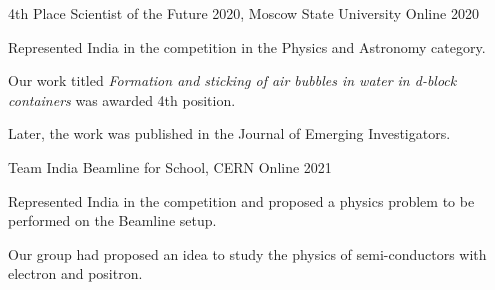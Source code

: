 



\begin{cventries}
  \cventry
  {4th Place} %
  {Scientist of the Future 2020, Moscow State University} %
  {Online} %
  {2020} %
  {
    \begin{cvitems}
      \item Represented India in the competition in the Physics and Astronomy category.
      \item Our work titled \emph{Formation and sticking of air bubbles in water in d-block containers} was awarded 4th position. 
      \item Later, the work was published in the Journal of Emerging Investigators.  
    \end{cvitems}
  }

  \cventry
  {Team India} %
  {Beamline for School, CERN} %
  {Online} %
  {2021} %
  {
    \begin{cvitems}
      \item Represented India in the competition and proposed a physics problem to be performed on the Beamline setup.
      \item Our group had proposed an idea to study the physics of semi-conductors with electron and positron.
    \end{cvitems}
  }
\end{cventries}


